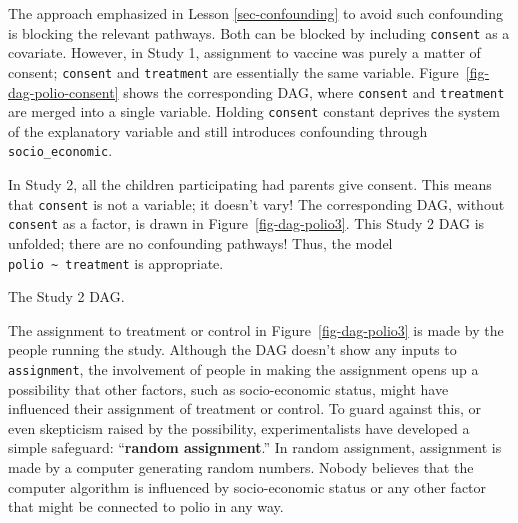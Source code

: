 \documentclass[
  letterpaper,
  DIV=11,
  numbers=noendperiod,
  oneside]{scrartcl}
\begin{document}
The approach emphasized in Lesson \ref{sec-confounding} to avoid such
confounding is blocking the relevant pathways. Both can be blocked by
including \texttt{consent} as a covariate. However, in Study 1,
assignment to vaccine was purely a matter of consent; \texttt{consent}
and \texttt{treatment} are essentially the same variable.
Figure~\ref{fig-dag-polio-consent} shows the corresponding DAG, where
\texttt{consent} and \texttt{treatment} are merged into a single
variable. Holding \texttt{consent} constant deprives the system of the
explanatory variable and still introduces confounding through
\texttt{socio\_economic}.

In Study 2, all the children participating had parents give consent.
This means that \texttt{consent} is not a variable; it doesn't vary! The
corresponding DAG, without \texttt{consent} as a factor, is drawn in
Figure~\ref{fig-dag-polio3}. This Study 2 DAG is unfolded; there are no
confounding pathways! Thus, the model
\texttt{polio\ \textasciitilde{}\ treatment} is appropriate.

\begin{marginfigure}


\caption{\label{fig-dag-polio3}The Study 2 DAG.}

\end{marginfigure}%

The assignment to treatment or control in Figure~\ref{fig-dag-polio3} is
made by the people running the study. Although the DAG doesn't show any
inputs to \texttt{assignment}, the involvement of people in making the
assignment opens up a possibility that other factors, such as
socio-economic status, might have influenced their assignment of
treatment or control. To guard against this, or even skepticism raised
by the possibility, experimentalists have developed a simple safeguard:
``\textbf{random assignment}.'' In random assignment, assignment is made
by a computer generating random numbers. Nobody believes that the
computer algorithm is influenced by socio-economic status or any other
factor that might be connected to polio in any way.
\end{document}
